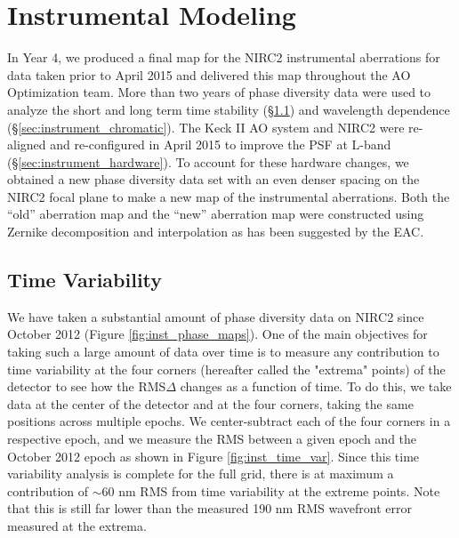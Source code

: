 \section{Instrumental Modeling}
\label{sec:instrument}

In Year 4, we produced a final map for the NIRC2 instrumental
aberrations for data taken prior to April 2015 and delivered this map
throughout the AO Optimization team. More than two years of
phase diversity data were used to analyze the short and long term time
stability (\S\ref{sec:instrument_time}) and wavelength dependence 
(\S\ref{sec:instrument_chromatic}). 
The Keck \textrm{II} AO system and NIRC2 were re-aligned and
re-configured in April 2015 to improve the PSF at L-band
(\S\ref{sec:instrument_hardware}). To account for these hardware changes, we 
obtained a new phase diversity data set with an even denser spacing on
the NIRC2 focal plane to make a new map of the instrumental
aberrations.
Both the ``old'' aberration map and the ``new'' aberration map were
constructed using Zernike decomposition and interpolation as has been
suggested by the EAC.

\subsection{Time Variability}
\label{sec:instrument_time}
We have taken a substantial amount of phase diversity data on NIRC2
since October 2012 (Figure \ref{fig:inst_phase_maps}). One of the main objectives
for taking such a large amount of data over time is to measure any
contribution to time variability at the four corners (hereafter called
the "extrema" points) of the detector to see how the RMS$\Delta$
changes as a function of time. To do this, we take data at the center
of the detector and at the four corners, taking the same positions
across multiple epochs. We center-subtract each of the four corners in
a respective epoch, and we measure the RMS between a given epoch and
the October 2012 epoch as shown in Figure \ref{fig:inst_time_var}. 
Since this time variability analysis is complete for the full grid,
there is at maximum a contribution of $\sim$60 nm RMS from time
variability at the extreme points. Note that this is still far lower
than the measured 190 nm RMS wavefront error measured at the extrema.


    
    
    
    
    
  
  
  
  
  
  